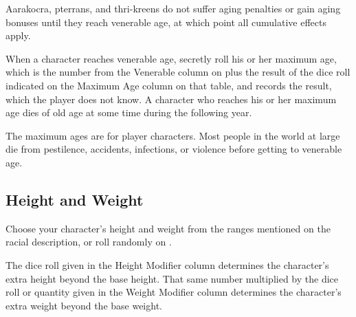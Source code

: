 Aarakocra, pterrans, and thri-kreens do not suffer aging penalties or gain aging bonuses until they reach venerable age, at which point all cumulative effects apply.

When a character reaches venerable age, secretly roll his or her maximum age, which is the number from the Venerable column on  plus the result of the dice roll indicated on the Maximum Age column on that table, and records the result, which the player does not know. A character who reaches his or her maximum age dies of old age at some time during the following year.

The maximum ages are for player characters. Most people in the world at large die from pestilence, accidents, infections, or violence before getting to venerable age.


\subsection{Height and Weight}
Choose your character's height and weight from the ranges mentioned on the racial description, or roll randomly on .

The dice roll given in the Height Modifier column determines the character's extra height beyond the base height. That same number multiplied by the dice roll or quantity given in the Weight Modifier column determines the character's extra weight beyond the base weight.

